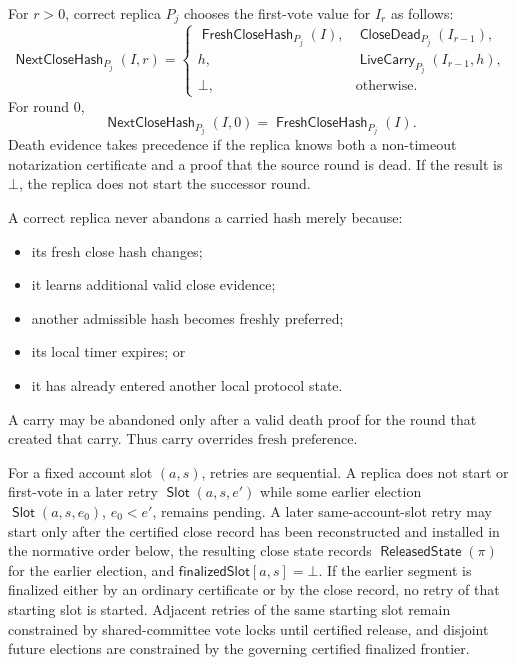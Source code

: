 \documentclass[sigplan,twocolumn,review,anonymous]{acmart}
\newcommand{\func}[1]{\operatorname{\mathsf{#1}}}
\newcommand{\Slot}{\func{Slot}}
\newcommand{\FreshCloseHash}{\func{FreshCloseHash}}
\newcommand{\CloseDead}{\func{CloseDead}}
\newcommand{\LiveCarry}{\func{LiveCarry}}
\newcommand{\finalizedSlot}{\mathsf{finalizedSlot}}
\newcommand{\ReleasedState}{\func{ReleasedState}}
\begin{document}
For \(r>0\), correct replica \(P_j\) chooses the first-vote value for \(I_r\) as follows:
\[
\func{NextCloseHash}_{P_j}(I,r)=
\begin{cases}
\FreshCloseHash_{P_j}(I),
  & \CloseDead_{P_j}(I_{r-1}),\\
h,
  & \LiveCarry_{P_j}(I_{r-1},h),\\
\bot,
  & \text{otherwise.}
\end{cases}
\]
For round \(0\),
\[
\func{NextCloseHash}_{P_j}(I,0)=
\FreshCloseHash_{P_j}(I).
\]
Death evidence takes precedence if the replica knows both a non-timeout notarization certificate and
a proof that the source round is dead.  If the result is \(\bot\), the replica does not start the
successor round.

A correct replica never abandons a carried hash merely because:
\begin{itemize}
\item its fresh close hash changes;
\item it learns additional valid close evidence;
\item another admissible hash becomes freshly preferred;
\item its local timer expires; or
\item it has already entered another local protocol state.
\end{itemize}
A carry may be abandoned only after a valid death proof for the round that created that carry.  Thus
\(\text{carry overrides fresh preference}\).

For a fixed account slot \((a,s)\), retries are sequential.  A replica does not start or first-vote in a later
retry \(\Slot(a,s,e')\) while some earlier election \(\Slot(a,s,e_0)\), \(e_0<e'\), remains pending.
A later same-account-slot retry may start only after the certified close record has been reconstructed and installed in the
normative order below, the resulting close state records \(\ReleasedState(\pi)\) for the earlier
election, and \(\finalizedSlot[a,s]=\bot\).  If the earlier segment is finalized either by an ordinary
certificate or by the close record, no retry of that starting slot is started.  Adjacent retries of the same starting slot remain
constrained by shared-committee vote locks until certified release, and disjoint future elections are
constrained by the governing certified finalized frontier.
\end{document}
